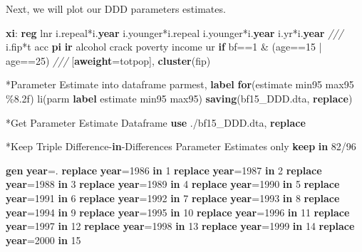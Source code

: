 \documentclass[
]{book}
\newenvironment{Shaded}{\begin{snugshade}}{\end{snugshade}}
\newcommand{\CommentTok}[1]{\textcolor[rgb]{0.56,0.35,0.01}{\textit{#1}}}
\newcommand{\FunctionTok}[1]{\textcolor[rgb]{0.13,0.29,0.53}{\textbf{#1}}}
\newcommand{\KeywordTok}[1]{\textcolor[rgb]{0.13,0.29,0.53}{\textbf{#1}}}
\newcommand{\NormalTok}[1]{#1}
\begin{document}
Next, we will plot our DDD parameters estimates.

\begin{Shaded}
\begin{Highlighting}[]
\KeywordTok{xi}\NormalTok{: }\KeywordTok{reg}\NormalTok{ lnr i.repeal*i.}\FunctionTok{year}\NormalTok{ i.younger*i.repeal i.younger*i.}\FunctionTok{year}\NormalTok{ i.yr*i.}\FunctionTok{year} \CommentTok{///}
\NormalTok{i.fip*t acc }\KeywordTok{pi} \KeywordTok{ir}\NormalTok{ alcohol crack  poverty income ur }\KeywordTok{if}\NormalTok{ bf==1 \& (age==15 | age==25) }\CommentTok{///}
\NormalTok{[}\KeywordTok{aweight}\NormalTok{=totpop], }\KeywordTok{cluster}\NormalTok{(fip)}

\NormalTok{*Parameter Estimate into dataframe}
\NormalTok{parmest, }\KeywordTok{label} \KeywordTok{for}\NormalTok{(estimate min95 max95 \%8.2f) li(parm }\KeywordTok{label}\NormalTok{ estimate min95 max95) }\KeywordTok{saving}\NormalTok{(bf15\_DDD.dta, }\KeywordTok{replace}\NormalTok{)}

\NormalTok{*Get Parameter Estimate Dataframe}
\KeywordTok{use}\NormalTok{ ./bf15\_DDD.dta, }\KeywordTok{replace}

\NormalTok{*Keep Triple Difference{-}}\KeywordTok{in}\NormalTok{{-}Differences Parameter Estimates only}
\KeywordTok{keep} \KeywordTok{in}\NormalTok{ 82/96}

\KeywordTok{gen}     \FunctionTok{year}\NormalTok{=.}
\KeywordTok{replace} \FunctionTok{year}\NormalTok{=1986 }\KeywordTok{in}\NormalTok{ 1}
\KeywordTok{replace} \FunctionTok{year}\NormalTok{=1987 }\KeywordTok{in}\NormalTok{ 2}
\KeywordTok{replace} \FunctionTok{year}\NormalTok{=1988 }\KeywordTok{in}\NormalTok{ 3}
\KeywordTok{replace} \FunctionTok{year}\NormalTok{=1989 }\KeywordTok{in}\NormalTok{ 4}
\KeywordTok{replace} \FunctionTok{year}\NormalTok{=1990 }\KeywordTok{in}\NormalTok{ 5}
\KeywordTok{replace} \FunctionTok{year}\NormalTok{=1991 }\KeywordTok{in}\NormalTok{ 6}
\KeywordTok{replace} \FunctionTok{year}\NormalTok{=1992 }\KeywordTok{in}\NormalTok{ 7}
\KeywordTok{replace} \FunctionTok{year}\NormalTok{=1993 }\KeywordTok{in}\NormalTok{ 8}
\KeywordTok{replace} \FunctionTok{year}\NormalTok{=1994 }\KeywordTok{in}\NormalTok{ 9}
\KeywordTok{replace} \FunctionTok{year}\NormalTok{=1995 }\KeywordTok{in}\NormalTok{ 10}
\KeywordTok{replace} \FunctionTok{year}\NormalTok{=1996 }\KeywordTok{in}\NormalTok{ 11}
\KeywordTok{replace} \FunctionTok{year}\NormalTok{=1997 }\KeywordTok{in}\NormalTok{ 12}
\KeywordTok{replace} \FunctionTok{year}\NormalTok{=1998 }\KeywordTok{in}\NormalTok{ 13}
\KeywordTok{replace} \FunctionTok{year}\NormalTok{=1999 }\KeywordTok{in}\NormalTok{ 14}
\KeywordTok{replace} \FunctionTok{year}\NormalTok{=2000 }\KeywordTok{in}\NormalTok{ 15}


\end{Highlighting}
\end{Shaded}
\end{document}
